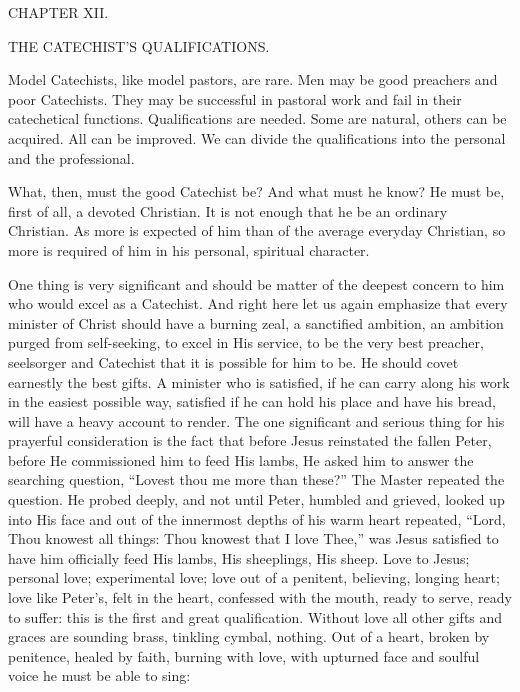 CHAPTER XII.

THE CATECHIST’S QUALIFICATIONS.

Model Catechists, like model pastors, are rare. Men may be good preachers and poor Catechists. They may be successful in pastoral work and fail in their catechetical functions. Qualifications are needed. Some are natural, others can be acquired. All can be improved. We can divide the qualifications into the personal and the professional.

What, then, must the good Catechist be?  And what must he know? He must be, first of all, a devoted Christian. It is not enough that he be an ordinary Christian. As more is expected of him than of the average everyday Christian, so more is required of him in his personal, spiritual character.

One thing is very significant and should be matter of the deepest concern to him who would excel as a Catechist. And right here let us again emphasize that every minister of Christ should have a burning zeal, a sanctified ambition, an ambition purged from self-seeking, to excel in His service, to be the very best preacher, seelsorger and Catechist that it is possible for him to be. He should covet earnestly the best gifts. A minister who is satisfied, if he can carry along his work in the easiest
possible way, satisfied if he can hold his place and have his bread, will have a heavy account to render. The one significant and serious thing for his prayerful consideration is the fact that before Jesus reinstated the fallen Peter, before He commissioned him to feed His lambs, He asked him to answer the searching question, “Lovest thou me more than these?” The Master repeated the question. He probed deeply,  and not until Peter, humbled and grieved, looked up into His face and out of the innermost depths of his warm heart repeated, “Lord, Thou knowest all things: Thou knowest that I love Thee,” was Jesus satisfied to have him officially feed His lambs, His sheeplings, His sheep. Love to Jesus; personal love; experimental love; love out of a penitent, believing, longing heart; love like Peter’s, felt in the heart, confessed with the mouth, ready to serve, ready to suffer: this is the first and great qualification. Without love all other gifts and graces are sounding brass, tinkling cymbal, nothing. Out of a heart, broken by penitence, healed by faith, burning with love, with upturned face and soulful voice he must be able to sing:


